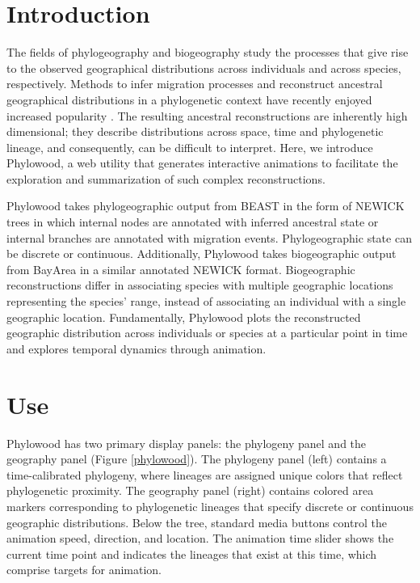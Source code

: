 \documentclass[11pt]{article}
\begin{document}
\section{Introduction}

The fields of phylogeography and biogeography study the processes that give rise to the observed geographical distributions across individuals and across species, respectively. Methods to infer migration processes and reconstruct ancestral geographical distributions in a phylogenetic context have recently enjoyed increased popularity \citep{ronquist97, beerli01, ree08, lemmon08, lemey09, yu10, landis12}. The resulting ancestral reconstructions are inherently high dimensional; they describe distributions across space, time and phylogenetic lineage, and consequently, can be difficult to interpret. Here, we introduce Phylowood, a web utility that generates interactive animations to facilitate the exploration and summarization of such complex reconstructions.

Phylowood takes phylogeographic output from BEAST \citep{drummond12} in the form of NEWICK trees in which internal nodes are annotated with inferred ancestral state or internal branches are annotated with migration events. Phylogeographic state can be discrete or continuous. Additionally, Phylowood takes biogeographic output from BayArea \citep{landis12} in a similar annotated NEWICK format.  Biogeographic reconstructions differ in associating species with multiple geographic locations representing the species' range, instead of associating an individual with a single geographic location. Fundamentally, Phylowood plots the reconstructed geographic distribution across individuals or species at a particular point in time and explores temporal dynamics through animation.

\section{Use}

Phylowood has two primary display panels: the phylogeny panel and the geography panel (Figure \ref{phylowood}). The phylogeny panel (left) contains a time-calibrated phylogeny, where lineages are assigned unique colors that reflect phylogenetic proximity. The geography panel (right) contains colored area markers corresponding to phylogenetic lineages that specify discrete or continuous geographic distributions. Below the tree, standard media buttons control the animation speed, direction, and location. The animation time slider shows the current time point and indicates the lineages that exist at this time, which comprise targets for animation.
\end{document}
